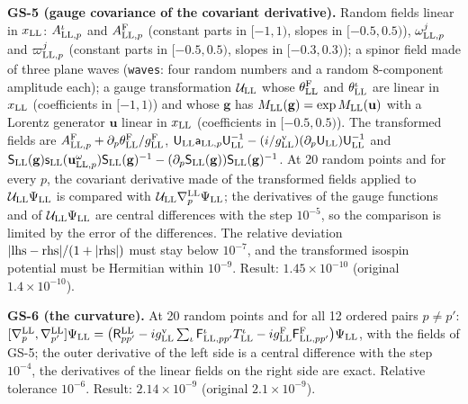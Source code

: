 \documentclass[
  10pt,
]{article}
\begin{document}
\textbf{GS-5 (gauge covariance of the covariant derivative).} Random
fields linear in \(x_{\rm LL}\): \(A^\iota_{{\rm LL},p}\) and
\(A^{\rm F}_{{\rm LL},p}\) (constant parts in \([-1,1)\), slopes in
\([-0.5,0.5)\)), \(\omega^j_{{\rm LL},p}\) and \(\varpi^j_{{\rm LL},p}\)
(constant parts in \([-0.5,0.5)\), slopes in \([-0.3,0.3)\)); a spinor
field made of three plane waves (\texttt{waves}: four random numbers and
a random 8-component amplitude each); a gauge transformation
\(\mathcal U_{\rm LL}\) whose \(\theta^{\rm F}_{\rm LL}\) and
\(\theta^\iota_{\rm LL}\) are linear in \(x_{\rm LL}\) (coefficients in
\([-1,1)\)) and whose \(\mathbf g\) has
\(M_{\rm LL}(\mathbf g)=\exp M_{\rm LL}(\mathbf u)\) with a Lorentz
generator \(\mathbf u\) linear in \(x_{\rm LL}\) (coefficients in
\([-0.5,0.5)\)). The transformed fields are
\(A^{\rm F}_{{\rm LL},p}+\partial_p\theta^{\rm F}_{\rm LL}/g^{\rm F}_{\rm LL}\),
\(\mathsf U_{\rm LL}\mathsf a_{{\rm LL},p}\mathsf U_{\rm LL}^{-1}-(i/g^{\rm v}_{\rm LL})(\partial_p\mathsf U_{\rm LL})\mathsf U_{\rm LL}^{-1}\)
and
\(\mathsf S_{\rm LL}(\mathbf g)\mathsf s_{\rm LL}(\mathbf u^\omega_{{\rm LL},p})\mathsf S_{\rm LL}(\mathbf g)^{-1}-(\partial_p\mathsf S_{\rm LL}(\mathbf g))\mathsf S_{\rm LL}(\mathbf g)^{-1}\).
At 20 random points and for every \(p\), the covariant derivative made
of the transformed fields applied to
\(\mathcal U_{\rm LL}\Psi_{\rm LL}\) is compared with
\(\mathcal U_{\rm LL}\nabla^{\rm LL}_p\Psi_{\rm LL}\); the derivatives
of the gauge functions and of \(\mathcal U_{\rm LL}\Psi_{\rm LL}\) are
central differences with the step \(10^{-5}\), so the comparison is
limited by the error of the differences. The relative deviation
\(\lvert{\rm lhs}-{\rm rhs}\rvert/(1+\lvert{\rm rhs}\rvert)\) must stay
below \(10^{-7}\), and the transformed isospin potential must be
Hermitian within \(10^{-9}\). Result: \(1.45\times10^{-10}\) (original
\(1.4\times10^{-10}\)).

\textbf{GS-6 (the curvature).} At 20 random points and for all 12
ordered pairs \(p\neq p'\):
\([\nabla^{\rm LL}_p,\nabla^{\rm LL}_{p'}]\Psi_{\rm LL}=\big(\mathsf R^{\rm LL}_{pp'}-ig^{\rm v}_{\rm LL}\sum_\iota\mathsf F^\iota_{{\rm LL},pp'}T^\iota_{\rm LL}-ig^{\rm F}_{\rm LL}\mathsf F^{\rm F}_{{\rm LL},pp'}\big)\Psi_{\rm LL}\),
with the fields of GS-5; the outer derivative of the left side is a
central difference with the step \(10^{-4}\), the derivatives of the
linear fields on the right side are exact. Relative tolerance
\(10^{-6}\). Result: \(2.14\times10^{-9}\) (original
\(2.1\times10^{-9}\)).
\end{document}
